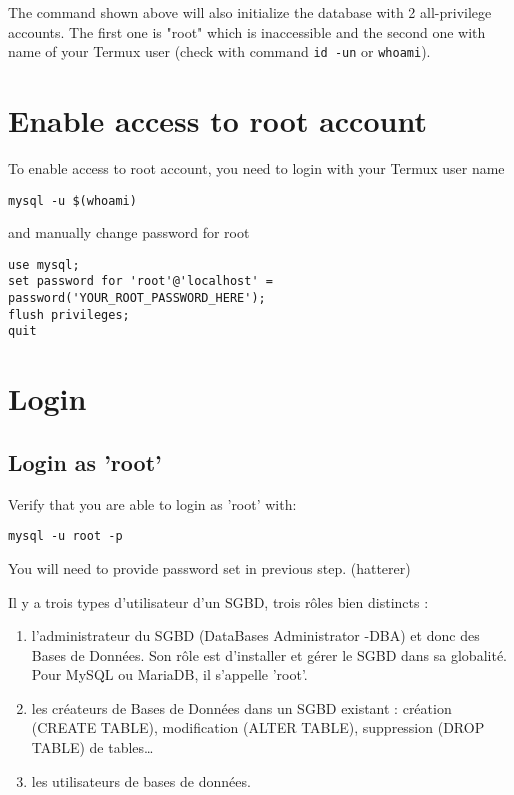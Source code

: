 \documentclass[11pt]{article}
\begin{document}
The command shown above will also initialize the database with 2 all-privilege accounts.
The first one is "root" which is inaccessible and the second one with name of your Termux user (check with command \texttt{id -un} or \texttt{whoami}).


\section{Enable access to root account}
\label{sec:org85c6464}
To enable access to root account, you need to login with your Termux user name


\begin{verbatim}
mysql -u $(whoami)
\end{verbatim}

and manually change password for root

\begin{verbatim}
use mysql;
set password for 'root'@'localhost' = password('YOUR_ROOT_PASSWORD_HERE');
flush privileges;
quit
\end{verbatim}


\section{Login}
\label{sec:orgff52445}
\subsection{Login as 'root'}
\label{sec:org151a498}

Verify that you are able to login as 'root' with:
\begin{verbatim}
mysql -u root -p
\end{verbatim}


You will need to provide password set in previous step. (hatterer)

Il y a trois types d'utilisateur d'un SGBD, trois rôles bien distincts :
\begin{enumerate}
\item l'administrateur du SGBD (DataBases Administrator -DBA) et donc des Bases de Données. Son rôle est d'installer et gérer le SGBD dans sa globalité. Pour MySQL ou MariaDB, il s'appelle 'root'.
\item les créateurs de Bases de Données dans un SGBD existant : création (CREATE TABLE), modification (ALTER TABLE), suppression (DROP TABLE) de tables\ldots{}
\item les utilisateurs de bases de données.
\end{enumerate}
\end{document}
